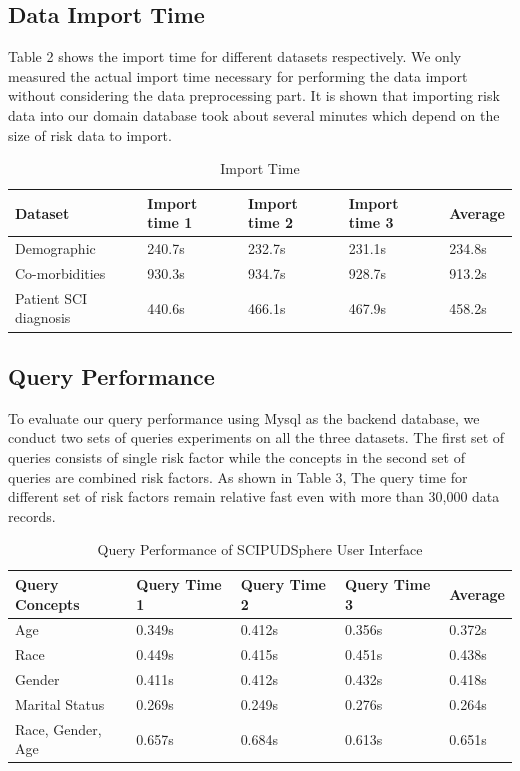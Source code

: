 \documentclass{amia}
\begin{document}
\subsection{Data Import Time}

Table 2 shows the import time for different datasets respectively. We only measured the actual import time necessary for performing the data import without considering the data preprocessing part. It is shown that importing risk data into our domain database took about several minutes which depend on the size of risk data to import.

\begin{table}[!ht]
\centering
\caption{Import Time}
  \begin{tabular}{|l|l|l|l|l|}
  \hline
    \textbf{Dataset}  & \textbf{Import time 1} & \textbf{Import time 2} & \textbf{Import time 3} & \textbf{Average} \\ \hline
    Demographic & 240.7s & 232.7s & 231.1s & 234.8s  \\ \hline
    Co-morbidities  & 930.3s & 934.7s & 928.7s & 913.2s  \\ \hline
    Patient SCI diagnosis  & 440.6s & 466.1s & 467.9s & 458.2s \\ \hline
  \end{tabular}
\end{table}

\subsection{Query Performance}
To evaluate our query performance using Mysql as the backend database, we conduct two sets of queries experiments on all the three datasets. The first set of queries consists of single risk factor while the concepts in the second set of queries are combined risk factors. As shown in Table 3, The query time for different set of risk factors remain relative fast even with more than 30,000 data records.

\begin{table}[!ht]
\centering
\caption{Query Performance of SCIPUDSphere User Interface}
  \begin{tabular}{|l|l|l|l|l|}
  \hline
    \textbf{Query Concepts}  & \textbf{Query Time 1} & \textbf{Query Time 2} & \textbf{Query Time 3} & \textbf{Average} \\ \hline
    Age & 0.349s & 0.412s & 0.356s & 0.372s \\ \hline
    Race & 0.449s & 0.415s & 0.451s & 0.438s \\ \hline
    Gender   & 0.411s & 0.412s & 0.432s & 0.418s \\ \hline
    Marital Status   & 0.269s & 0.249s & 0.276s & 0.264s \\ \hline
    Race, Gender, Age & 0.657s & 0.684s & 0.613s & 0.651s \\ \hline
  \end{tabular}
\end{table}
\end{document}
